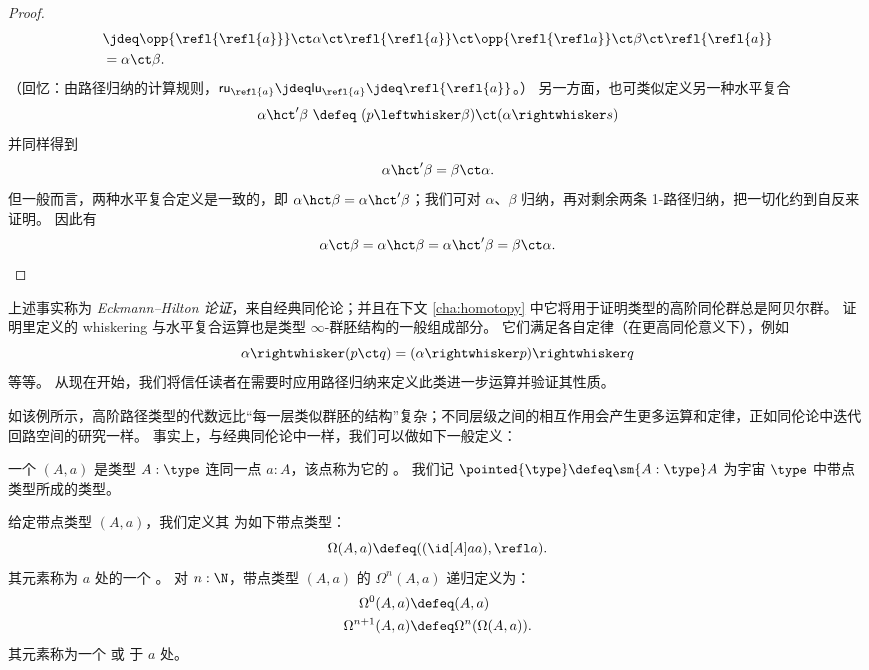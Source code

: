 \begin{proof}
\begin{align*}
  &\jdeq \opp{\refl{\refl{a}}} \ct \alpha \ct \refl{\refl{a}} \ct \opp{\refl{\refl a}} \ct \beta \ct \refl{\refl{a}}\\
  &= \alpha \ct \beta.
\end{align*}
（回忆：由路径归纳的计算规则，$\mathsf{ru}_{\refl{a}} \jdeq \mathsf{lu}_{\refl{a}} \jdeq \refl{\refl{a}}$。）
另一方面，也可类似定义另一种水平复合
\[
\alpha\hct'\beta\ \defeq\ (p\leftwhisker \beta)\ct (\alpha\rightwhisker s)
\]
并同样得到
\[
\alpha\hct'\beta = \beta\ct\alpha.
\]
%
但一般而言，两种水平复合定义是一致的，即 $\alpha\hct\beta = \alpha\hct'\beta$；我们可对 $\alpha$、$\beta$ 归纳，再对剩余两条 1-路径归纳，把一切化约到自反来证明。
因此有
\[\alpha \ct \beta = \alpha\hct\beta = \alpha\hct'\beta = \beta\ct\alpha.
\qedhere
\]
\end{proof}

上述事实称为 \emph{Eckmann--Hilton 论证}，来自经典同伦论；并且在下文 \cref{cha:homotopy} 中它将用于证明类型的高阶同伦群总是阿贝尔群。
证明里定义的 whiskering 与水平复合运算也是类型 $\infty$-群胚结构的一般组成部分。
它们满足各自定律（在更高同伦意义下），例如
\[ \alpha \rightwhisker (p\ct q) = (\alpha \rightwhisker p) \rightwhisker q \]
等等。
从现在开始，我们将信任读者在需要时应用路径归纳来定义此类进一步运算并验证其性质。

如该例所示，高阶路径类型的代数远比“每一层类似群胚的结构”复杂；不同层级之间的相互作用会产生更多运算和定律，正如同伦论中迭代回路空间的研究一样。
事实上，与经典同伦论中一样，我们可以做如下一般定义：

\begin{defn} \label{def:pointedtype}
  一个 
  $(A,a)$ 是类型 $A:\type$ 连同一点 $a:A$，该点称为它的 。
  我们记 $\pointed{\type} \defeq \sm{A:\type} A$ 为宇宙 $\type$ 中带点类型所成的类型。
\end{defn}

\begin{defn} \label{def:loopspace}
  给定带点类型 $(A,a)$，我们定义其 
  为如下带点类型：
  \[\Omega(A,a)\defeq ((\id[A]aa),\refl a).\]
  其元素称为 $a$ 处的一个 。
  对 $n:\N$，带点类型 $(A,a)$ 的  $\Omega^{n}(A,a)$
  递归定义为：
  \begin{align*}
    \Omega^0(A,a)&\defeq(A,a)\\
    \Omega^{n+1}(A,a)&\defeq\Omega^n(\Omega(A,a)).
  \end{align*}
  其元素称为一个 
  或 
  于 $a$ 处。
\end{defn}


